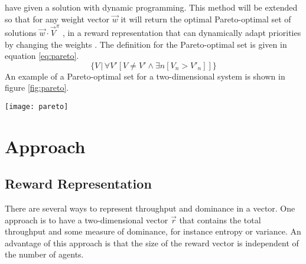 \documentclass{article}
\makeatletter
\newenvironment{figurehere}
{\def\@captype{figure}}
{}
\makeatother
\begin{document}
\begin{multicols}{2}
	\citet{hansen2004dynamic} have given a solution with dynamic programming.
	This method will be extended so that for any weight vector $\vec{w}$ it will
	return the optimal Pareto-optimal set of solutions $\vec{w} \cdot
	\vec{V}^\pi$ \citep{vamplew2011empirical}, in a reward representation that
	can dynamically adapt priorities by changing the weights
	\citep{barrett2008learning,natarajan2005dynamic}.
	The definition for the Pareto-optimal set is given in equation
	\ref{eq:pareto}.
	\begin{equation}
		\label{eq:pareto}
		\Big\{ V\, \Big| \, \forall V'[ V \neq V' \land \exists n [V_n > V'_n]] \Big\}
	\end{equation}
	An example of a Pareto-optimal set for a two-dimensional system is shown in
	figure \ref{fig:pareto}.

	\begin{figurehere}
		\centering
		\texttt{[image: pareto]}
	   \label{fig:pareto}
	\end{figurehere}


	\section{Approach}
	\label{sec:approach}

		\subsection{Reward Representation}
		\label{sub:reward_representation}
		There are several ways to represent throughput and dominance in a vector.
		One approach is to have a two-dimensional vector $\vec{r}$ that contains
		the total throughput and some measure of dominance, for instance entropy
		or variance. An advantage of this approach is that the size of the reward
		vector is independent of the number of agents.


\end{multicols}
\end{document}
